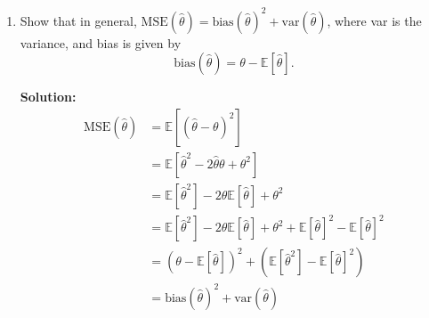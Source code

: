 \documentclass[letter, 12pt]{article}
\begin{document}
	\begin{enumerate}[wide = 0pt, label = \arabic*)]
		\item {Show that in general, $ \text{MSE}(\hat{\theta}) = \text{bias}(\hat{\theta})^2 + \text{var}(\hat{\theta}) $, where var is the variance, and bias is given by
		\begin{equation}
			\text{bias}(\hat\theta) = \theta - \mathbb{E}[\hat{\theta}] .
		\end{equation}}
		\par{\textbf{Solution:}}
		\begin{align*}
			\text{MSE}(\hat{\theta}) &= \mathbb{E}[(\hat{\theta} - \theta)^2] \\
			&= \mathbb{E}[\hat{\theta}^2 - 2 \hat{\theta} \theta + \theta^2] \\
			&= \mathbb{E}[\hat{\theta}^2] - 2 \theta \mathbb{E}[\hat{\theta}] + \theta^2 \\
			&= \mathbb{E}[\hat{\theta}^2] - 2 \theta \mathbb{E}[\hat{\theta}] + \theta^2 + \mathbb{E}[\hat{\theta}]^2 - \mathbb{E}[\hat{\theta}]^2 \\
			&= (\theta - \mathbb{E}[\hat{\theta}])^2 + (\mathbb{E}[\hat{\theta}^2] - \mathbb{E}[\hat{\theta}]^2) \\
			&= \text{bias}(\hat{\theta})^2 + \text{var}(\hat{\theta}) 
		\end{align*}
		

\end{enumerate}
\end{document}
